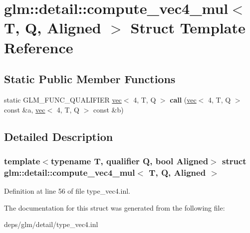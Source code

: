\hypertarget{structglm_1_1detail_1_1compute__vec4__mul}{}\section{glm\+:\+:detail\+:\+:compute\+\_\+vec4\+\_\+mul$<$ T, Q, Aligned $>$ Struct Template Reference}
\label{structglm_1_1detail_1_1compute__vec4__mul}
\subsection*{Static Public Member Functions}
\begin{DoxyCompactItemize}
\item 
\mbox{\label{structglm_1_1detail_1_1compute__vec4__mul_a349917211c527b2f0c2dc552932fce5b}} 
static G\+L\+M\+\_\+\+F\+U\+N\+C\+\_\+\+Q\+U\+A\+L\+I\+F\+I\+ER \hyperlink{structglm_1_1vec}{vec}$<$ 4, T, Q $>$ {\bfseries call} (\hyperlink{structglm_1_1vec}{vec}$<$ 4, T, Q $>$ const \&a, \hyperlink{structglm_1_1vec}{vec}$<$ 4, T, Q $>$ const \&b)
\end{DoxyCompactItemize}


\subsection{Detailed Description}
\subsubsection*{template$<$typename T, qualifier Q, bool Aligned$>$\newline
struct glm\+::detail\+::compute\+\_\+vec4\+\_\+mul$<$ T, Q, Aligned $>$}



Definition at line 56 of file type\+\_\+vec4.\+inl.



The documentation for this struct was generated from the following file\+:\begin{DoxyCompactItemize}
\item 
deps/glm/detail/type\+\_\+vec4.\+inl\end{DoxyCompactItemize}
